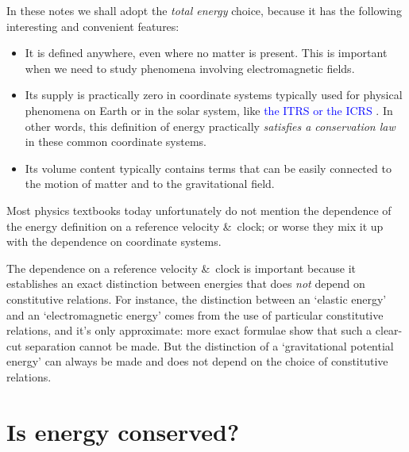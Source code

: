 \documentclass[a4paper,12pt,%
onecolumn,oneside,%
british%
]{memoir}
\newcommand*{\amp}{\&}
\renewcommand*{\|}[1][]{\nonscript\:#1\vert\nonscript\:\mathopen{}}
\newcommand*{\sect}{\S}%
\renewcommand*{\autoref}[3][\sect\,\ref]{\textcolor{blue}{#3}
\raisebox{0.6ex}{\color{blue}\miniscule%
\faIcon{angle-right}%
\;#1{#2}\;p.\,\pageref{#2}}}
\newcommand*{\yE}{E}
\newcommand*{\yH}{\varPhi}%
\begin{document}
In these notes we shall adopt the \emph{total energy} choice, because it has the following interesting and convenient features:
\begin{itemize}
\item It is defined anywhere, even where no matter is present. This is important when we need to study phenomena involving electromagnetic fields.

\item\label{item:energy_no_supply} Its supply is practically zero in coordinate systems typically used for physical phenomena on Earth or in the solar system, like \autoref{sec:coords}{the ITRS or the ICRS}. In other words, this definition of energy practically \emph{satisfies a conservation law} in these common coordinate systems.

\item Its volume content %
  typically contains terms that can be easily connected to the motion of matter and to the gravitational field.
\end{itemize}




\begin{warning}
  Most physics textbooks today unfortunately do not mention the dependence of the energy definition on a reference velocity \amp\ clock; or worse they mix it up with the dependence on coordinate systems.

  \smallskip

  The dependence on a reference velocity \amp\ clock is important because it establishes an exact distinction between energies that does \emph{not} depend on constitutive relations. For instance, the distinction between an \enquote*{elastic energy} and an \enquote*{electromagnetic energy} comes from the use of particular constitutive relations, and it's only approximate: more exact formulae show that such a clear-cut separation cannot be made. But the distinction of a \enquote*{gravitational potential energy} can always be made and does not depend on the choice of constitutive relations.
\end{warning}

\section{Is energy conserved?}
\label{sec:energy_conserved}
\end{document}
